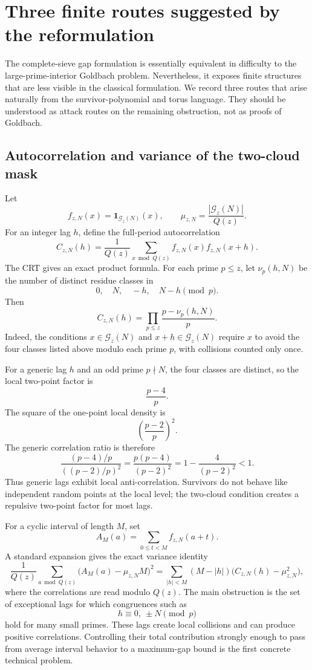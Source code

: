 \documentclass[11pt]{article}
\theoremstyle{plain}
\theoremstyle{definition}
\theoremstyle{remark}
\newcommand{\G}{\mathcal G}
\newcommand{\one}{\mathbf 1}
\begin{document}
\section{Three finite routes suggested by the reformulation}
\label{sec:routes}

The complete-sieve gap formulation is essentially equivalent in difficulty to
the large-prime-interior Goldbach problem.  Nevertheless, it exposes finite
structures that are less visible in the classical formulation.  We record three
routes that arise naturally from the survivor-polynomial and torus language.
They should be understood as attack routes on the remaining obstruction, not as
proofs of Goldbach.

\subsection{Autocorrelation and variance of the two-cloud mask}

Let
\[
f_{z,N}(x)=\one_{\G_z(N)}(x),\qquad
\mu_{z,N}=\frac{|\G_z(N)|}{Q(z)}.
\]
For an integer lag \(h\), define the full-period autocorrelation
\[
C_{z,N}(h)
=
\frac1{Q(z)}
\sum_{x\bmod Q(z)}f_{z,N}(x)f_{z,N}(x+h).
\]
The CRT gives an exact product formula.  For each prime \(p\le z\), let
\(\nu_p(h,N)\) be the number of distinct residue classes in
\[
0,\quad N,\quad -h,\quad N-h\pmod p.
\]
Then
\[
C_{z,N}(h)=\prod_{p\le z}\frac{p-\nu_p(h,N)}p.
\]
Indeed, the conditions \(x\in\G_z(N)\) and \(x+h\in\G_z(N)\) require \(x\) to
avoid the four classes listed above modulo each prime \(p\), with collisions
counted only once.

For a generic lag \(h\) and an odd prime \(p\nmid N\), the four classes are
distinct, so the local two-point factor is
\[
\frac{p-4}{p}.
\]
The square of the one-point local density is
\[
\left(\frac{p-2}{p}\right)^2.
\]
The generic correlation ratio is therefore
\[
\frac{(p-4)/p}{((p-2)/p)^2}
=
\frac{p(p-4)}{(p-2)^2}
=
1-\frac4{(p-2)^2}<1.
\]
Thus generic lags exhibit local anti-correlation.  Survivors do not behave like
independent random points at the local level; the two-cloud condition creates a
repulsive two-point factor for most lags.

For a cyclic interval of length \(M\), set
\[
A_M(a)=\sum_{0\le t<M} f_{z,N}(a+t).
\]
A standard expansion gives the exact variance identity
\[
\frac1{Q(z)}\sum_{a\bmod Q(z)}\bigl(A_M(a)-\mu_{z,N}M\bigr)^2
=
\sum_{|h|<M}(M-|h|)\bigl(C_{z,N}(h)-\mu_{z,N}^2\bigr),
\]
where the correlations are read modulo \(Q(z)\).  The main obstruction is the
set of exceptional lags for which congruences such as
\[
h\equiv 0,\ \pm N\pmod p
\]
hold for many small primes.  These lags create local collisions and can produce
positive correlations.  Controlling their total contribution strongly enough to
pass from average interval behavior to a maximum-gap bound is the first concrete
technical problem.
\end{document}
